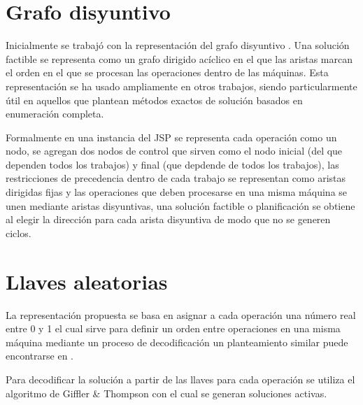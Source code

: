 \section{Grafo disyuntivo}
Inicialmente se trabajó con la representación del grafo disyuntivo \cite{balas1969machine}. Una solución factible se representa como un grafo dirigido acíclico en el que las aristas marcan el orden en el que se procesan las operaciones dentro de las máquinas. Esta representación se ha usado ampliamente en otros trabajos, siendo particularmente útil en aquellos que plantean métodos exactos de solución basados en enumeración completa\cite{Brucker2001}. 


Formalmente en una instancia del JSP se representa cada operación como un nodo, se agregan dos nodos de control que sirven como el nodo inicial (del que dependen todos los trabajos) y final (que depdende de todos los trabajos), las restricciones de precedencia dentro de cada trabajo se representan como aristas dirigidas fijas y las operaciones que deben procesarse en una misma máquina se unen mediante aristas disyuntivas, una solución factible o planificación se obtiene al elegir la dirección para cada arista disyuntiva de modo que no se generen ciclos.  


\section{Llaves aleatorias}
La representación propuesta se basa en asignar a cada operación una número real entre 0 y 1 el cual sirve para definir un orden entre operaciones en una misma máquina mediante un proceso de decodificación un planteamiento similar puede encontrarse en \cite{bean1996}.

Para decodificar la solución a partir de las llaves para cada operación se utiliza el algoritmo de Giffler \& Thompson \cite{Giffler1960} con el cual se generan soluciones activas.